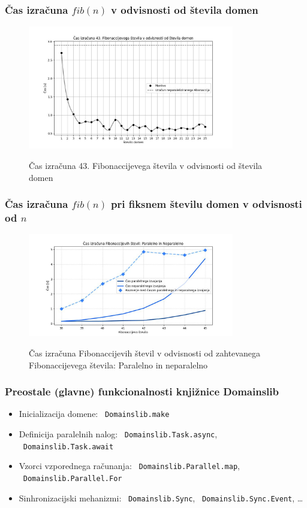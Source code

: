 \documentclass{beamer}
\begin{document}
\begin{frame}
    \frametitle{Čas izračuna $fib(n)$ v odvisnosti od števila domen}
    \begin{figure}
        \centering
        \caption{Čas izračuna 43. Fibonaccijevega števila v odvisnosti od števila domen}
        \includegraphics[width=9cm]{slike/fib_par_v_odvisnosti_od_domen.jpg}
        \label{fig:fib_par_v_odvisnosti_od_domen}
      \end{figure}
\end{frame}

\begin{frame}
    \frametitle{Čas izračuna $fib(n)$ pri fiksnem številu domen v odvisnosti od $n$}
    \begin{figure}
        \centering
        \caption{Čas izračuna Fibonaccijevih števil v odvisnosti od zahtevanega Fibonaccijevega števila: Paralelno in neparalelno}
        \includegraphics[width=9cm]{slike/fib_par_v_odvisnosti_od_n.jpg}
        \label{fig:fib_par_v_odvisnosti_od_n}
      \end{figure}
\end{frame}

\begin{frame}
  \frametitle{Preostale (glavne) funkcionalnosti knjižnice Domainslib}
  \begin{itemize}
        \item Inicializacija domene: ~\texttt{Domainslib.make}
        \item Definicija paralelnih nalog: ~\texttt{Domainslib.Task.async}, ~\texttt{Domainslib.Task.await}
        \item Vzorci vzporednega računanja: ~\texttt{Domainslib.Parallel.map}, ~\texttt{Domainslib.Parallel.For}
        \item Sinhronizacijski mehanizmi: ~\texttt{Domainslib.Sync}, ~\texttt{Domainslib.Sync.Event}, \dots
      \end{itemize}
\end{frame}
    
\end{document}
